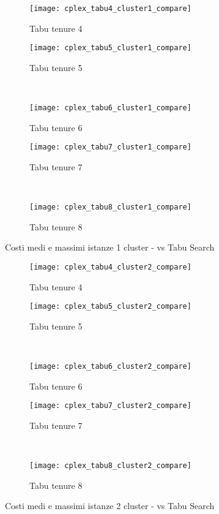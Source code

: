 \begin{figure}[H]
	\centering
	\begin{subfigure}[b]{.45\textwidth}
			\texttt{[image: cplex\_tabu4\_cluster1\_compare]}
			\caption{Tabu tenure 4}
	\end{subfigure}
	\quad
	\begin{subfigure}[b]{.45\textwidth}
			\texttt{[image: cplex\_tabu5\_cluster1\_compare]}
			\caption{Tabu tenure 5}
	\end{subfigure}
	\\
	\begin{subfigure}[b]{.45\textwidth}
			\texttt{[image: cplex\_tabu6\_cluster1\_compare]}
			\caption{Tabu tenure 6}
	\end{subfigure}
	\quad
	\begin{subfigure}[b]{.45\textwidth}
			\texttt{[image: cplex\_tabu7\_cluster1\_compare]}
			\caption{Tabu tenure 7}
	\end{subfigure}
	\\
	\begin{subfigure}[b]{.45\textwidth}
			\texttt{[image: cplex\_tabu8\_cluster1\_compare]}
			\caption{Tabu tenure 8}
	\end{subfigure}
	\caption{Costi medi e massimi istanze 1 cluster -  vs Tabu Search}
	\label{fig:costi cplex tabu cluster 1 completo}
\end{figure}

\begin{figure}[H]
	\centering
	\begin{subfigure}[b]{.45\textwidth}
			\texttt{[image: cplex\_tabu4\_cluster2\_compare]}
			\caption{Tabu tenure 4}
	\end{subfigure}
	\quad
	\begin{subfigure}[b]{.45\textwidth}
			\texttt{[image: cplex\_tabu5\_cluster2\_compare]}
			\caption{Tabu tenure 5}
	\end{subfigure}
	\\
	\begin{subfigure}[b]{.45\textwidth}
			\texttt{[image: cplex\_tabu6\_cluster2\_compare]}
			\caption{Tabu tenure 6}
	\end{subfigure}
	\quad
	\begin{subfigure}[b]{.45\textwidth}
			\texttt{[image: cplex\_tabu7\_cluster2\_compare]}
			\caption{Tabu tenure 7}
	\end{subfigure}
	\\
	\begin{subfigure}[b]{.45\textwidth}
			\texttt{[image: cplex\_tabu8\_cluster2\_compare]}
			\caption{Tabu tenure 8}
	\end{subfigure}
	\caption{Costi medi e massimi istanze 2 cluster -  vs Tabu Search}
	\label{fig:costi cplex tabu cluster 2 completo}
\end{figure}

